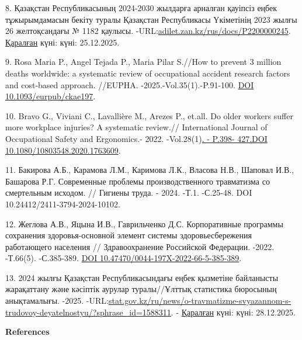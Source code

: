 \begin{refs}
8. Қазақстан Республикасының 2024-2030 жылдарға арналған қауіпсіз еңбек
тұжырымдамасын бекіту туралы Қазақстан Республикасы Үкіметінің 2023
жылғы 26 желтоқсандағы № 1182 қаулысы.
-URL:\href{https://adilet.zan.kz/rus/docs/P2200000245}{adilet.zan.kz/rus/docs/P2200000245}.
\href{https://adilet.zan.kz/kaz/docs/Z1400000243.-Қаралған}{Қаралған}
күні: күні: 25.12.2025.

9. Rosa Maria P., Angel Tejada P., Maria Pilar S.//How to prevent 3
million deaths worldwide: a systematic review of occupational accident
research factors and cost-based approach. //EUPHA.
-2025.-Vol.35(1).-P.91-100.
\href{https://doi.org/10.1093/eurpub/ckae197}{DOI
10.1093/eurpub/ckae197}.

10. Bravo G., Viviani C., Lavallière M., Arezes P., et.all. Do older
workers suffer more workplace injuries? A systematic review.//
International Journal of Occupational Safety and Ergonomics.-
2022. -Vol.28(1)\href{https://doi.org/10.1080/10803548.2020.1763609}{. -
P.398- 427.DOI 10.1080/10803548.2020.1763609}.

11. Бакирова А.Б., Карамова Л.М., Каримова Л.К., Власова Н.В., Шаповал
И.В., Башарова Р.Г. Современные проблемы производственного травматизма
со смертельным исходом. // Гигиены труда. - 2024. -Т.1. -С.25-48. DOI
10.24412/2411-3794-2024-10102.

12. Жеглова А.В., Яцына И.В., Гаврильченко Д.С. Корпоративные программы
сохранения здоровья-основной элемент системы здоровьесбережения
работающего населения // Здравоохранение Российской Федерации. -2022.
-Т.66(5). -С.385-389.
\href{https://doi.org/10.47470/0044-197X-2022-66-5-385-389}{DOI
10.47470/0044-197X-2022-66-5-385-389}.

13. 2024 жылғы Қазақстан Республикасындағы еңбек қызметіне байланысты
жарақаттану және кәсіптік аурулар туралы//Ұлттық статистика бюросының
анықтамалығы. -2025.
-URL:\href{https://stat.gov.kz/ru/news/o-travmatizme-svyazannom-s-trudovoy-deyatelnostyu/?sphrase_id=1588311}{stat.gov.kz/ru/news/o-travmatizme-svyazannom-s-trudovoy-deyatelnostyu/?sphrase\_id=1588311}.
- \href{https://adilet.zan.kz/kaz/docs/Z1400000243.-Қаралған}{Қаралған}
күні: күні: 28.12.2025.
\end{refs}

\begin{center}
{\bfseries References}
\end{center}

